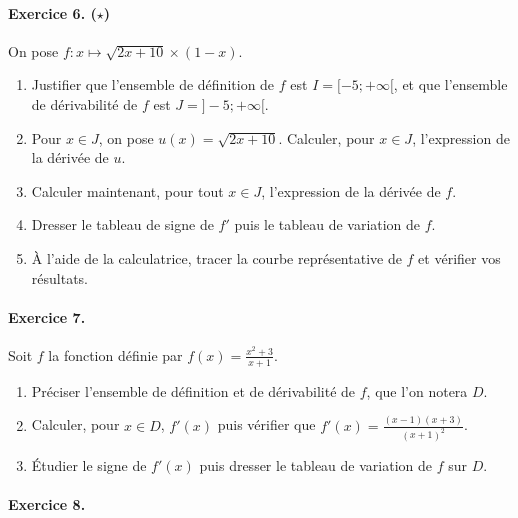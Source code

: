 \documentclass[11pt]{article}
\begin{document}
\paragraph{Exercice 6. ($\star$)} On pose $f:x\mapsto \sqrt{2x+10}\times(1-x)$.
\begin{enumerate}
  \item Justifier que l'ensemble de définition de $f$ est $I=[-5;+\infty[$, et que
    l'ensemble de dérivabilité de $f$ est $J=]-5;+\infty[$.
    \item Pour $x\in J$, on pose $u(x)=\sqrt{2x+10}$. Calculer, pour $x\in J$,
      l'expression de la dérivée de $u$.
    \item Calculer maintenant, pour tout $x\in J$, l'expression de la dérivée de
      $f$.
    \item Dresser le tableau de signe de $f'$ puis le tableau de variation de
      $f$.
    \item À l'aide de la calculatrice, tracer la courbe représentative de $f$ et
      vérifier vos résultats.
\end{enumerate}


\paragraph{Exercice 7.} Soit $f$ la fonction définie par
$f(x)=\frac{x^2+3}{x+1}$.
\begin{enumerate}
  \item Préciser l'ensemble de définition et de dérivabilité de $f$, que l'on
    notera $D$.
  \item Calculer, pour $x\in D$, $f'(x)$ puis vérifier que $f'(x) =
    \frac{(x-1)(x+3)}{(x+1)^2}$.
  \item Étudier le signe de $f'(x)$ puis dresser le tableau de variation de $f$
    sur $D$.
\end{enumerate}
\paragraph{Exercice 8.} 
\end{document}

